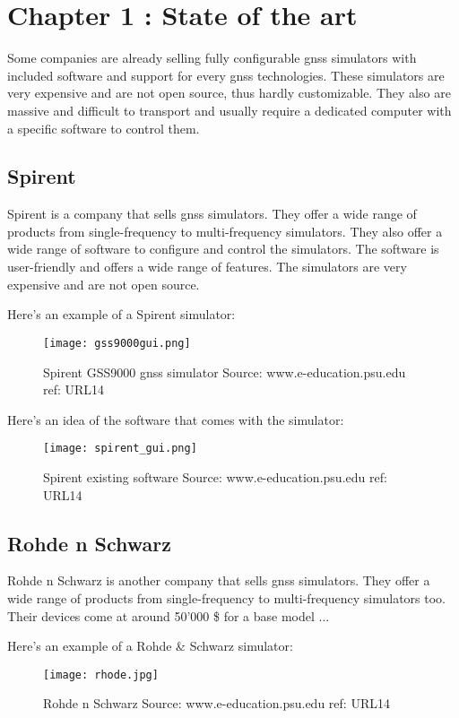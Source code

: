
\chapter{Chapter 1 :  State of the art}

Some companies are already selling fully configurable \gls{gnss} simulators with included software and support for every \gls{gnss} technologies. These simulators are very expensive and are not open source, thus hardly customizable. They also are massive and difficult to transport and usually require a dedicated computer with a specific software to control them.


\section{Spirent}

Spirent is a company that sells \gls{gnss} simulators. They offer a wide range of products from single-frequency to multi-frequency simulators. They also offer a wide range of software to configure and control the simulators. The software is user-friendly and offers a wide range of features. The simulators are very expensive and are not open source.

Here's an example of a Spirent simulator:
\begin{figure}[H]
    \centering
    \texttt{[image: gss9000gui.png]}
    \caption[Spirent GSS9000 gnss simulator]{Spirent GSS9000 gnss simulator Source: www.e-education.psu.edu ref: URL14}
    \label{fig:spirent_gss9000gui}
\end{figure}


Here's an idea of the software that comes with the simulator:
\begin{figure}[H]
    \centering
    \texttt{[image: spirent\_gui.png]}
    \caption[Spirent existing software]{Spirent existing software Source: www.e-education.psu.edu ref: URL14}
    \label{fig:spirent_gui}
\end{figure}


\section{Rohde n Schwarz}

Rohde n Schwarz is another company that sells \gls{gnss} simulators. They offer a wide range of products from single-frequency to multi-frequency simulators too. Their devices come at around 50'000 \$ for a base model ...

Here's an example of a Rohde \& Schwarz simulator:

\begin{figure}[H]
    \centering
    \texttt{[image: rhode.jpg]}
    \caption[Rohde n Schwarz]{Rohde n Schwarz Source: www.e-education.psu.edu ref: URL14}
    \label{fig:rhode}
\end{figure}
